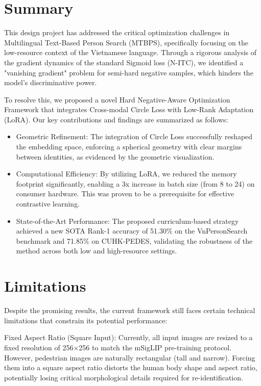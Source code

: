 \documentclass[../main.tex]{subfiles}
\begin{document}
\section{Summary}

This design project has addressed the critical optimization challenges in Multilingual Text-Based Person Search (MTBPS), specifically focusing on the low-resource context of the Vietnamese language. Through a rigorous analysis of the gradient dynamics of the standard Sigmoid loss (N-ITC), we identified a "vanishing gradient" problem for semi-hard negative samples, which hinders the model's discriminative power.

\noindent To resolve this, we proposed a novel Hard Negative-Aware Optimization Framework that integrates Cross-modal Circle Loss with Low-Rank Adaptation (LoRA). Our key contributions and findings are summarized as follows:
\begin{itemize}
    \item Geometric Refinement: The integration of Circle Loss successfully reshaped the embedding space, enforcing a spherical geometry with clear margins between identities, as evidenced by the geometric visualization.

\item Computational Efficiency: By utilizing LoRA, we reduced the memory footprint significantly, enabling a 3x increase in batch size (from 8 to 24) on consumer hardware. This was proven to be a prerequisite for effective contrastive learning.

\item State-of-the-Art Performance: The proposed curriculum-based strategy achieved a new SOTA Rank-1 accuracy of 51.30\% on the VnPersonSearch benchmark and 71.85\% on CUHK-PEDES, validating the robustness of the method across both low and high-resource settings.
\end{itemize}

\section{Limitations}
Despite the promising results, the current framework still faces certain technical limitations that constrain its potential performance:

Fixed Aspect Ratio (Square Input): Currently, all input images are resized to a fixed resolution of 256×256 to match the mSigLIP pre-training protocol. However, pedestrian images are naturally rectangular (tall and narrow). Forcing them into a square aspect ratio distorts the human body shape and aspect ratio, potentially losing critical morphological details required for re-identification.
\end{document}
